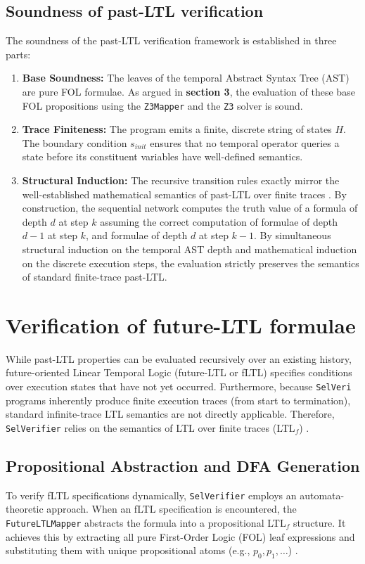 \documentclass{article}
\begin{document}
\subsection{Soundness of past-LTL verification}
The soundness of the past-LTL verification framework is established in three parts:
\begin{enumerate}
    \item \textbf{Base Soundness:} The leaves of the temporal Abstract Syntax Tree (AST) are pure FOL formulae. As argued in \textbf{section 3}, the evaluation of these base FOL propositions using the \texttt{Z3Mapper} and the \texttt{Z3} solver is sound.
    \item \textbf{Trace Finiteness:} The program emits a finite, discrete string of states $H$. The boundary condition $s_{init}$ ensures that no temporal operator queries a state before its constituent variables have well-defined semantics.
    \item \textbf{Structural Induction:} The recursive transition rules exactly mirror the well-established mathematical semantics of past-LTL over finite traces \cite{pnueli1985past}. By construction, the sequential network computes the truth value of a formula of depth $d$ at step $k$ assuming the correct computation of formulae of depth $d-1$ at step $k$, and formulae of depth $d$ at step $k-1$. By simultaneous structural induction on the temporal AST depth and mathematical induction on the discrete execution steps, the evaluation strictly preserves the semantics of standard finite-trace past-LTL.
\end{enumerate}

\newpage
\section{Verification of future-LTL formulae}

While past-LTL properties can be evaluated recursively over an existing history, future-oriented Linear Temporal Logic (future-LTL or fLTL) specifies conditions over execution states that have not yet occurred. Furthermore, because \texttt{SelVeri} programs inherently produce finite execution traces (from start to termination), standard infinite-trace LTL semantics are not directly applicable. Therefore, \texttt{SelVerifier} relies on the semantics of LTL over finite traces (LTL$_f$) \cite{degiacomo2013ltlf}.

\subsection{Propositional Abstraction and DFA Generation}
To verify fLTL specifications dynamically, \texttt{SelVerifier} employs an automata-theoretic approach. When an fLTL specification is encountered, the \texttt{FutureLTLMapper} abstracts the formula into a propositional LTL$_f$ structure. It achieves this by extracting all pure First-Order Logic (FOL) leaf expressions and substituting them with unique propositional atoms (e.g., $p_0, p_1, \dots$) %
. 
\end{document}
